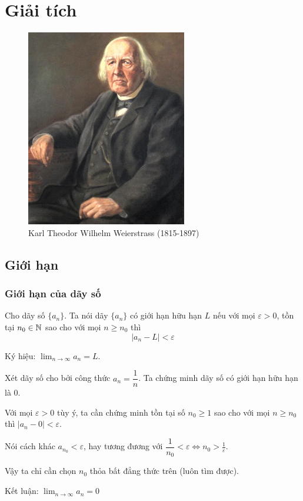 \chapter{Giải tích}

\begin{figure}[ht]
    \centering
    \includegraphics{mathematicians/Weiertrass.jpg}
    \captionsetup{labelformat=empty}
    \caption{Karl Theodor Wilhelm Weierstrass (1815-1897)}
\end{figure}

\section{Giới hạn}

\subsection*{Giới hạn của dãy số}

\begin{definition}
    Cho dãy số $\{ a_n \}$. Ta nói dãy $\{ a_n \}$ có giới hạn hữu hạn $L$ nếu với mọi $\varepsilon > 0$, tồn tại $n_0 \in \mathbb{N}$ sao cho với mọi $n \geqslant n_0$ thì 
    \begin{equation*}
        | a_{n} - L | < \varepsilon
    \end{equation*}

    Ký hiệu: $\displaystyle{\lim_{n \to \infty} a_n = L}$.
\end{definition}

\begin{example}
    Xét dãy số cho bởi công thức $a_n = \dfrac{1}{n}$. Ta chứng minh dãy số có giới hạn hữu hạn là 0.

    Với mọi $\varepsilon > 0$ tùy ý, ta cần chứng minh tồn tại số $n_0 \geqslant 1$ sao cho với mọi $n \geqslant n_0$ thì $| a_n - 0 | < \varepsilon$.

    Nói cách khác $a_{n_0} < \varepsilon$, hay tương đương với $\dfrac{1}{n_0} < \varepsilon \Leftrightarrow n_0 > \frac{1}{\varepsilon}$.

    Vậy ta chỉ cần chọn $n_0$ thỏa bất đẳng thức trên (luôn tìm được).

    Kết luận: $\displaystyle{\lim_{n \to \infty} a_n = 0}$
\end{example}

